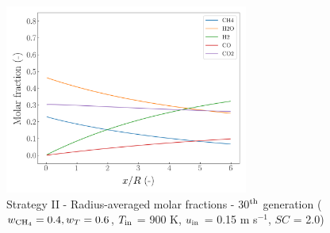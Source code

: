 \documentclass[preprint,12pt]{elsarticle}
\begin{document}
%

\begin{figure}[h!]
\centering
\includegraphics[width=80mm]{results/5Eq/40C_60T/GEN30-AVG.png}
\caption{\label{fig:5RES4060G30-avg} Strategy II - Radius-averaged molar fractions -  30$^{\rm{th}}$ generation ($w_{\rm{CH_4}} = 0.4, w_T = 0.6$, $T_{\rm{in}}$ = 900 K, $u_{\rm{in}}$ = 0.15 m s$^{-1}$, $SC$ = 2.0)}
\end{figure}
\end{document}
